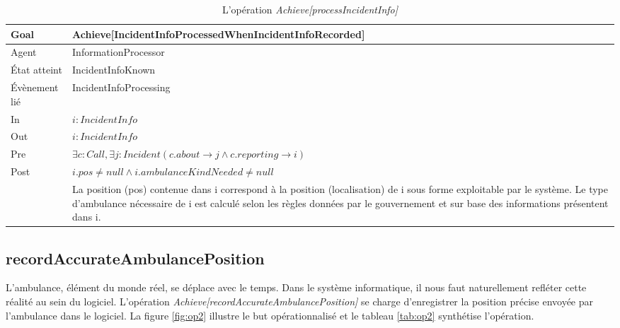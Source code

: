 	\begin{table}[!h] \centering
		\begin{tabularx}{\textwidth}{|l|X|} \hline
			Goal & Achieve[IncidentInfoProcessedWhenIncidentInfoRecorded] \\ \hline
			Agent & InformationProcessor \\ \hline
			État atteint & IncidentInfoKnown \\ \hline
			Évènement lié & IncidentInfoProcessing \\ \hline
			In & $i: IncidentInfo$ \\ \hline
			Out & $i: IncidentInfo$ \\ \hline
			Pre & $\exists c: Call, \exists j: Incident (c.about \rightarrow j \wedge c.reporting \rightarrow i)$ \\ \hline
			Post & $i.pos \neq null \wedge i.ambulanceKindNeeded \neq null $  \\
				 & La position (pos) contenue dans i correspond à la position (localisation) de i sous forme exploitable par le système. 
				  Le type d'ambulance nécessaire de i est calculé selon les règles données par le gouvernement et sur base des 
				  informations présentent dans i. \\ \hline
		\end{tabularx}
		\caption{L'opération \textit{Achieve[processIncidentInfo]}}\label{tab:op1}
	\end{table}

\subsection{recordAccurateAmbulancePosition}
	
	L'ambulance, élément du monde réel, se déplace avec le temps. Dans le système
	informatique, il nous faut naturellement refléter cette réalité au 
	sein du logiciel. L'opération \textit{Achieve[recordAccurateAmbulancePosition]}
	se charge d'enregistrer la position précise envoyée par l'ambulance
	dans le logiciel. La figure \ref{fig:op2} illustre
	le but opérationnalisé et le tableau \ref{tab:op2} synthétise l'opération.
	
	
